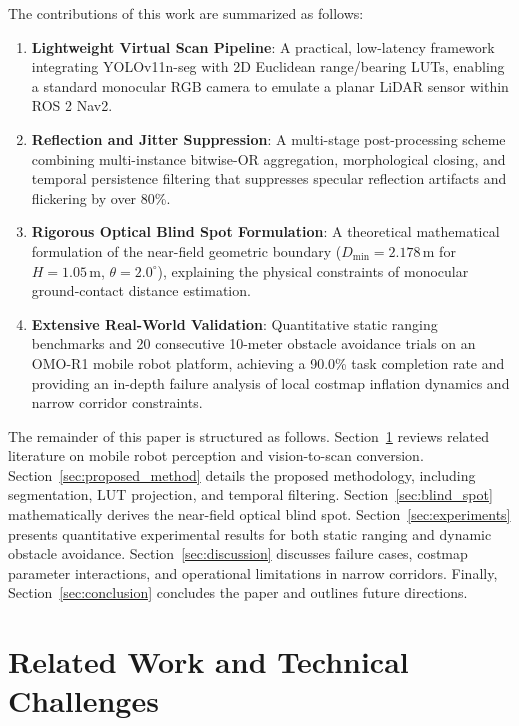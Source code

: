 \documentclass{ieeeaccess}
\begin{document}
The contributions of this work are summarized as follows:
\begin{enumerate}
  \item \textbf{Lightweight Virtual Scan Pipeline}: A practical, low-latency framework integrating YOLOv11n-seg with 2D Euclidean range/bearing LUTs, enabling a standard monocular RGB camera to emulate a planar LiDAR sensor within ROS 2 Nav2.
  \item \textbf{Reflection and Jitter Suppression}: A multi-stage post-processing scheme combining multi-instance bitwise-OR aggregation, morphological closing, and temporal persistence filtering that suppresses specular reflection artifacts and flickering by over 80\%.
  \item \textbf{Rigorous Optical Blind Spot Formulation}: A theoretical mathematical formulation of the near-field geometric boundary ($D_{\min} = 2.178$\,m for $H = 1.05$\,m, $\theta = 2.0^\circ$), explaining the physical constraints of monocular ground-contact distance estimation.
  \item \textbf{Extensive Real-World Validation}: Quantitative static ranging benchmarks and 20 consecutive 10-meter obstacle avoidance trials on an OMO-R1 mobile robot platform, achieving a 90.0\% task completion rate and providing an in-depth failure analysis of local costmap inflation dynamics and narrow corridor constraints.
\end{enumerate}

The remainder of this paper is structured as follows. Section~\ref{sec:related_work} reviews related literature on mobile robot perception and vision-to-scan conversion. Section~\ref{sec:proposed_method} details the proposed methodology, including segmentation, LUT projection, and temporal filtering. Section~\ref{sec:blind_spot} mathematically derives the near-field optical blind spot. Section~\ref{sec:experiments} presents quantitative experimental results for both static ranging and dynamic obstacle avoidance. Section~\ref{sec:discussion} discusses failure cases, costmap parameter interactions, and operational limitations in narrow corridors. Finally, Section~\ref{sec:conclusion} concludes the paper and outlines future directions.

\section{Related Work and Technical Challenges}
\label{sec:related_work}
\end{document}
